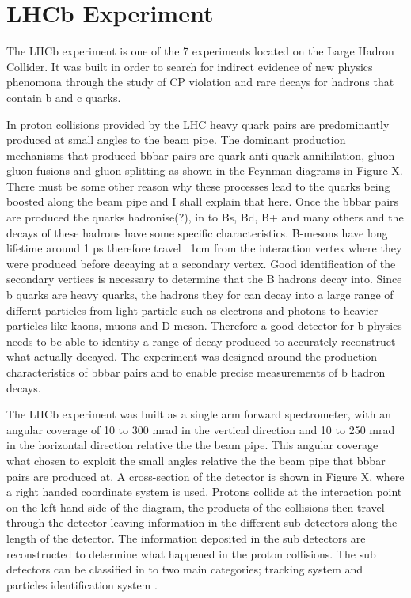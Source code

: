 \section{LHCb Experiment}

The LHCb experiment is one of the 7 experiments located on the Large Hadron Collider. It was built in order to search for indirect evidence of new physics phenomona through the study of CP violation and rare decays for hadrons that contain b and c quarks.

In proton collisions provided by the LHC heavy quark pairs are predominantly produced at small angles to the beam pipe. The dominant production mechanisms that produced bbbar pairs are quark anti-quark annihilation, gluon-gluon fusions and  gluon splitting as shown in the Feynman diagrams in Figure X. There must be some other reason why these processes lead to the quarks being boosted along the beam pipe and I shall explain that here. Once the bbbar pairs are produced the quarks hadronise(?), in to Bs, Bd, B+ and many others and the decays of these hadrons have some specific characteristics. B-mesons have long lifetime around 1 ps therefore travel ~1cm from the interaction vertex where they were produced before decaying at a secondary vertex. Good identification of the secondary vertices is necessary to determine that the B hadrons decay into. Since b quarks are heavy quarks, the hadrons they for can decay into a large range of differnt particles from light particle such as electrons and photons to heavier particles like kaons, muons and D meson. Therefore a good detector for b physics needs to be able to identity a range of decay produced to accurately reconstruct what actually decayed. The experiment was designed around the production characteristics of bbbar pairs and to enable precise measurements of b hadron decays. 

The LHCb experiment was built as a single arm forward spectrometer, with an angular coverage of 10 to 300 mrad in the vertical direction and 10 to 250 mrad in the horizontal direction relative the the beam pipe. This angular coverage what chosen to exploit the small angles relative the the beam pipe that bbbar pairs are produced at. A cross-section of the detector is shown in Figure X, where a right handed coordinate system is used. Protons collide at the interaction point on the left hand side of the diagram, the products of the collisions then travel through the detector leaving information in the different sub detectors along the length of the detector. The information deposited in the sub detectors are reconstructed to determine what happened in the proton collisions. The sub detectors can be classified in to two main categories; tracking system and particles identification system .

